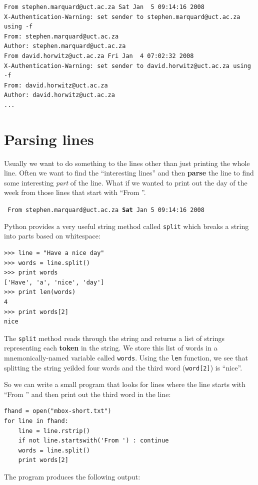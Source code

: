 \documentclass[10pt]{book}
\begin{document}
\beforeverb
\begin{verbatim}
From stephen.marquard@uct.ac.za Sat Jan  5 09:14:16 2008
X-Authentication-Warning: set sender to stephen.marquard@uct.ac.za using -f
From: stephen.marquard@uct.ac.za
Author: stephen.marquard@uct.ac.za
From david.horwitz@uct.ac.za Fri Jan  4 07:02:32 2008
X-Authentication-Warning: set sender to david.horwitz@uct.ac.za using -f
From: david.horwitz@uct.ac.za
Author: david.horwitz@uct.ac.za
...
\end{verbatim}
\afterverb
%

\section{Parsing lines}

Usually we want to do something to the lines other than just 
printing the whole line.  Often we want to find the ``interesting
lines'' and then {\bf parse} the line to find some interesting
{\em part} of the line.  What if we wanted to print out the day of the 
week from those lines that start with ``From ''.

{\tt
From stephen.marquard@uct.ac.za {\bf Sat} Jan  5 09:14:16 2008
}

Python provides a very useful string method called {\tt split}
which breaks a string into parts based on whitespace:

\beforeverb
\begin{verbatim}
>>> line = "Have a nice day"
>>> words = line.split()
>>> print words
['Have', 'a', 'nice', 'day']
>>> print len(words)
4
>>> print words[2]
nice
\end{verbatim}
\afterverb
%
The {\tt split} method reads through the string and returns a
list of strings representing each {\bf token} in the string.
We store this list of words in a mnemonically-named variable
called {\tt words}.  Using the {\tt len} function, we see that
splitting the string yeilded four words and the third word 
({\tt word[2]}) is ``nice''.

So we can write a small program that looks for lines where the 
line starts with ``From '' and then print out the third word in the 
line:

\beforeverb
\begin{verbatim}
fhand = open("mbox-short.txt")
for line in fhand:
    line = line.rstrip()
    if not line.startswith('From ') : continue
    words = line.split()
    print words[2]
\end{verbatim}
\afterverb
%
The program produces the following output:
\end{document}
